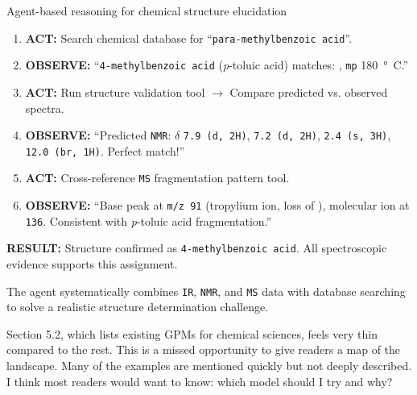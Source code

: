 \begin{reply}
\begin{examplebox}[label={example:structure_eluc}]{Agent-based reasoning for chemical structure elucidation}
\begin{enumerate}
\item \textbf{ACT:} Search chemical database for \enquote{\texttt{para-methylbenzoic acid}}.
\item \textbf{OBSERVE:} \enquote{\texttt{4-methylbenzoic acid} (\textit{p}-toluic acid) matches: , \texttt{mp} \SI{180}{\degree C}.}
\item \textbf{ACT:} Run structure validation tool $\rightarrow$ Compare predicted vs. observed spectra.
\item \textbf{OBSERVE:} \enquote{Predicted  \texttt{NMR}: $\delta$  \texttt{7.9 (d, 2H)}, \texttt{7.2 (d, 2H)}, \texttt{2.4 (s, 3H)}, \texttt{12.0 (br, 1H)}. Perfect match!}
\item \textbf{ACT:} Cross-reference \texttt{MS} fragmentation pattern tool.
\item \textbf{OBSERVE:} \enquote{Base peak at \texttt{m/z 91} (tropylium ion, loss of ), molecular ion at \texttt{136}. Consistent with \textit{p}-toluic acid fragmentation.}
\end{enumerate}


\textbf{RESULT:} Structure confirmed as \texttt{4-methylbenzoic acid}. All spectroscopic evidence supports this assignment.

The agent systematically combines \texttt{IR}, \texttt{NMR}, and \texttt{MS} data with database searching to solve a realistic structure determination challenge.
\end{examplebox}
\end{reply}

\begin{point}
Section 5.2, which lists existing GPMs for chemical sciences, feels very thin compared to the rest. This is a missed opportunity to give readers a map of the landscape. Many of the examples are mentioned quickly but not deeply described. I think most readers would want to know: which model should I try and why?
\end{point}

